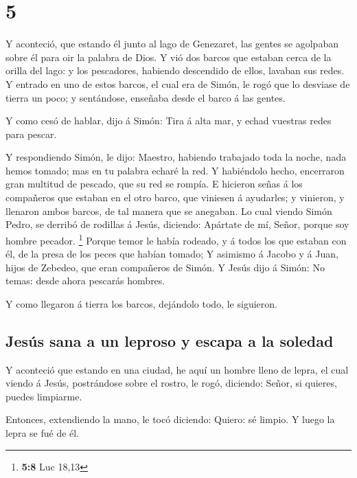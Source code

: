 \hypertarget{section-4}{%
\section{5}\label{section-4}}

 Y aconteció, que estando él junto al lago de Genezaret, las
gentes se agolpaban sobre él para oir la palabra de Dios.  Y
vió dos barcos que estaban cerca de la orilla del lago: y los
pescadores, habiendo descendido de ellos, lavaban sus redes.
 Y entrado en uno de estos barcos, el cual era de Simón, le
rogó que lo desviase de tierra un poco; y sentándose, enseñaba desde el
barco á las gentes.

 Y como cesó de hablar, dijo á Simón: Tira á alta mar, y
echad vuestras redes para pescar.

 Y respondiendo Simón, le dijo: Maestro, habiendo trabajado
toda la noche, nada hemos tomado; mas en tu palabra echaré la red.
 Y habiéndolo hecho, encerraron gran multitud de pescado,
que su red se rompía.  E hicieron señas á los compañeros que
estaban en el otro barco, que viniesen á ayudarles; y vinieron, y
llenaron ambos barcos, de tal manera que se anegaban.  Lo
cual viendo Simón Pedro, se derribó de rodillas á Jesús, diciendo:
Apártate de mí, Señor, porque soy hombre pecador. \footnote{\textbf{5:8}
  Luc 18,13}  Porque temor le había rodeado, y á todos los
que estaban con él, de la presa de los peces que habían tomado;
 Y asimismo á Jacobo y á Juan, hijos de Zebedeo, que eran
compañeros de Simón. Y Jesús dijo á Simón: No temas: desde ahora
pescarás hombres.

 Y como llegaron á tierra los barcos, dejándolo todo, le
siguieron.

\hypertarget{jesuxfas-sana-a-un-leproso-y-escapa-a-la-soledad}{%
\subsection{Jesús sana a un leproso y escapa a la
soledad}\label{jesuxfas-sana-a-un-leproso-y-escapa-a-la-soledad}}

 Y aconteció que estando en una ciudad, he aquí un hombre
lleno de lepra, el cual viendo á Jesús, postrándose sobre el rostro, le
rogó, diciendo: Señor, si quieres, puedes limpiarme.

 Entonces, extendiendo la mano, le tocó diciendo: Quiero:
sé limpio. Y luego la lepra se fué de él.

